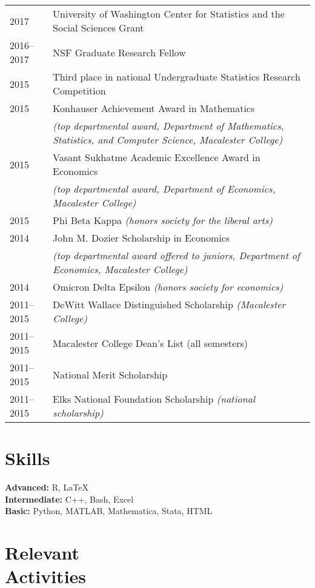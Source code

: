 \documentclass[margin,centered]{res}
\begin{document}
\begin{resume}
\begin{tabular}{@{}p{0.8in}p{4in}}
2017 & University of Washington Center for Statistics and the Social Sciences Grant\\
2016--2017 & NSF Graduate Research Fellow\\
2015 & Third place in national Undergraduate Statistics Research Competition\\
2015 & Konhauser Achievement Award in Mathematics \\
&\textit{(top departmental award, Department of Mathematics, Statistics, and Computer Science, Macalester College)}\\
2015 & Vasant Sukhatme Academic Excellence Award in Economics\\& \textit{(top departmental award, Department of Economics, Macalester College)}\\
2015 & Phi Beta Kappa \textit{(honors society for the liberal arts)}\\
2014 & John M. Dozier Scholarship in Economics \\ &\textit{(top departmental award offered to juniors, Department of Economics, Macalester College)}\\
2014 & Omicron Delta Epsilon \textit{(honors society for economics)}\\
2011--2015 & DeWitt Wallace Distinguished Scholarship \textit{(Macalester College)}\\
2011--2015 & Macalester College Dean's List (all semesters)\\
2011--2015 & National Merit Scholarship \\
2011--2015 & Elks National Foundation Scholarship \textit{(national scholarship)}\\
\end{tabular}





\section{\sc Skills}
{\bf Advanced:} R, LaTeX\\
{\bf Intermediate:} C++, Bash, Excel\\
{\bf Basic:} Python, MATLAB, Mathematica, Stata, HTML


\section{\sc Relevant \\ Activities}



\end{resume}
\end{document}
